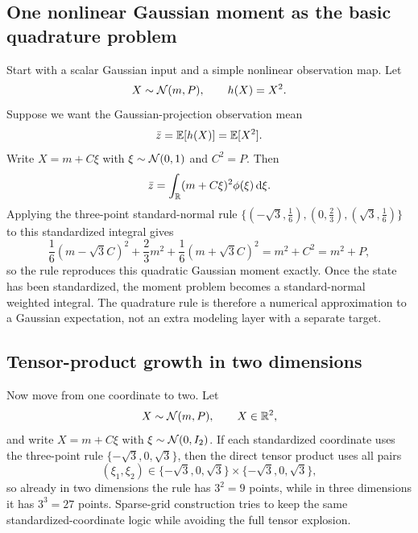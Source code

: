 \subsection{One nonlinear Gaussian moment as the basic quadrature problem}
\label{subsec:p34-scalar-motivation}

Start with a scalar Gaussian input and a simple nonlinear observation map.
Let
\begin{equation}
  X\sim\mathcal{N}(m,P),
  \qquad
  h(X)=X^2.
  \label{eq:p34-scalar-gaussian-model}
\end{equation}
Suppose we want the Gaussian-projection observation mean
\begin{equation}
  \bar z = \mathbb{E}[h(X)] = \mathbb{E}[X^2].
  \label{eq:p34-scalar-target-mean}
\end{equation}
Write \(X=m+C\xi\) with \(\xi\sim\mathcal{N}(0,1)\) and \(C^2=P\).  Then
\begin{equation}
  \bar z
  =
  \int_{\mathbb{R}} (m+C\xi)^2\phi(\xi)\,\mathrm d\xi.
  \label{eq:p34-standardized-integral}
\end{equation}
Applying the three-point standard-normal rule
$\{(-\sqrt3,\tfrac16),(0,\tfrac23),(\sqrt3,\tfrac16)\}$ to this standardized
integral gives
\begin{equation}
  \frac16(m-\sqrt3C)^2+\frac23m^2+\frac16(m+\sqrt3C)^2
  = m^2+C^2 = m^2+P,
  \label{eq:bf-hd-sgqf-scalar-x2-exact}
\end{equation}
so the rule reproduces this quadratic Gaussian moment exactly.  Once the state
has been standardized, the moment problem becomes a standard-normal weighted
integral.  The quadrature rule is therefore a numerical approximation to a
Gaussian expectation, not an extra modeling layer with a separate target.

\subsection{Tensor-product growth in two dimensions}
\label{subsec:p34-2d-motivation}

Now move from one coordinate to two.  Let
\begin{equation}
  X\sim\mathcal{N}(m,P),
  \qquad X\in\mathbb{R}^2,
  \label{eq:p34-2d-gaussian}
\end{equation}
and write \(X=m+C\xi\) with \(\xi\sim\mathcal{N}(0,I_2)\).  If each standardized
coordinate uses the three-point rule \(\{-\sqrt3,0,\sqrt3\}\), then the direct
tensor product uses all pairs
\begin{equation}
  (\xi_1,\xi_2)
  \in
  \{-\sqrt3,0,\sqrt3\}\times\{-\sqrt3,0,\sqrt3\},
  \label{eq:p34-2d-tensor-points}
\end{equation}
so already in two dimensions the rule has \(3^2=9\) points, while in three
dimensions it has \(3^3=27\) points.  Sparse-grid construction tries to keep the
same standardized-coordinate logic while avoiding the full tensor explosion.


